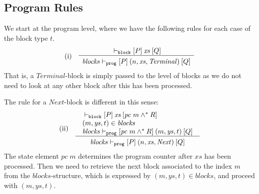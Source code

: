\documentclass[sigplan,10pt,review]{acmart}\settopmatter{printfolios=true,printccs=false,printacmref=false}
\newcommand{\sconj}{\wedge^*}
\newcommand{\ttrip}[5]{\mathit{#1} \vdash_{\mathrm{#2}}[#3]\:#4\:[#5]}
\newcommand{\pc}{\mathit{pc}}
\newcommand{\RuleC}[2]{\begin{array}{c}#1\\\hline\noalign{\smallskip}#2\end{array}}
\begin{document}
\subsection{Program Rules}
%
We start at the program level, where we have the following rules for
each case of the block type $t$.
\[
\begin{array}{l l}
\mbox{(i)} & \RuleC{\ttrip{}{\mathtt{block}}{P}{\mathit{xs}}{Q}}
     {\ttrip{\mathit{blocks}}{\mathtt{prog}}{P}{(n, \mathit{xs}, \mathit{Terminal})}{Q}}
\end{array}
\]
That is, a $\mathit{Terminal}$-block is simply passed to the level of
blocks as we do not need to look at any other block after this has been processed.  

The rule for a $\mathit{Next}$-block is different in this sense:
\[
\begin{array}{l l}
\mbox{(ii)} & \RuleC{\begin{array}{l} \ttrip{}{\mathtt{block}}{P}{\mathit{xs}}{\pc\;m \sconj R} \\
                                      (m, \mathit{ys},t) \in \mathit{blocks} \\
                                       \ttrip{\mathit{blocks}}{\mathtt{prog}}{\pc\;m \sconj R}{(m, \mathit{ys},t)}{Q}
                     \end{array}}
     {\ttrip{\mathit{blocks}}{\mathtt{prog}}{P}{(n, \mathit{xs}, \mathit{Next})}{Q}}
\end{array}
\]
The state element $\pc\;m$ determines the program counter after $\mathit{xs}$ has been
processed. Then we need to retrieve the next block associated to the index $m$ from the $\mathit{blocks}$-structure,
which is expressed by $(m, \mathit{ys},t) \in \mathit{blocks}$, and proceed with 
$(m, \mathit{ys},t)$.
\end{document}
